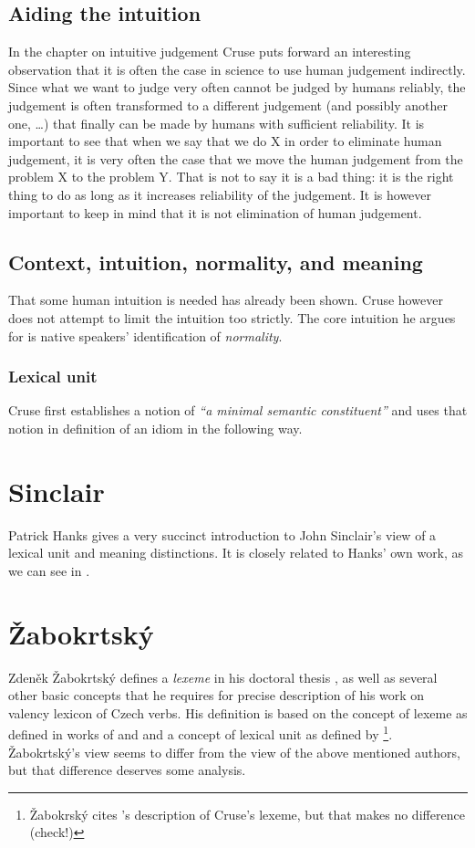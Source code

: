 \subsection{Aiding the intuition}
In the chapter on intuitive judgement Cruse puts forward an interesting observation that it is often the case in science to use human judgement indirectly. Since what we want to judge very often cannot be judged by humans reliably, the judgement is often transformed to a different judgement (and possibly another one, \ldots) that finally can be made by humans with sufficient reliability. It is important to see that when we say that we do X in order to eliminate human judgement, it is very often the case that we move the human judgement from the problem X to the problem Y. That is not to say it is a bad thing: it is the right thing to do as long as it increases reliability of the judgement. It is however important to keep in mind that it is not elimination of human judgement. 

\subsection{Context, intuition, normality, and meaning}
That some human intuition is needed has already been shown. Cruse however does not attempt to limit the intuition too strictly. The core intuition he argues for is native speakers' identification of \emph{normality}. 

\subsubsection{Lexical unit}
Cruse first establishes a notion of \emph{``a minimal semantic constituent''} and uses that notion in definition of an idiom in the following way.


\section{Sinclair}
Patrick Hanks gives a very succinct introduction to John Sinclair's \citep{sinclair:wiki} view of a lexical unit and meaning distinctions. It is closely related to Hanks' own work, as we can see in \citet{hanks:norms}.

\section{Žabokrtský}
Zdeněk Žabokrtský defines a \emph{lexeme} in his doctoral thesis \citep{zabokrtsky:2005a}, as well as several other basic concepts that he requires for precise description of his work on valency lexicon of Czech verbs. His definition is based on the concept of lexeme as defined in works of \citet{cermak:91} and \citet{filipec:1994} and a concept of lexical unit as defined by \citet{cruse:1986}\footnote{Žabokrský cites \citealp{verspoor:1997}'s description of Cruse's lexeme, but that makes no difference {\xxx(check!)}}. Žabokrtský's view seems to differ from the view of the above mentioned authors, but that difference deserves some analysis.

